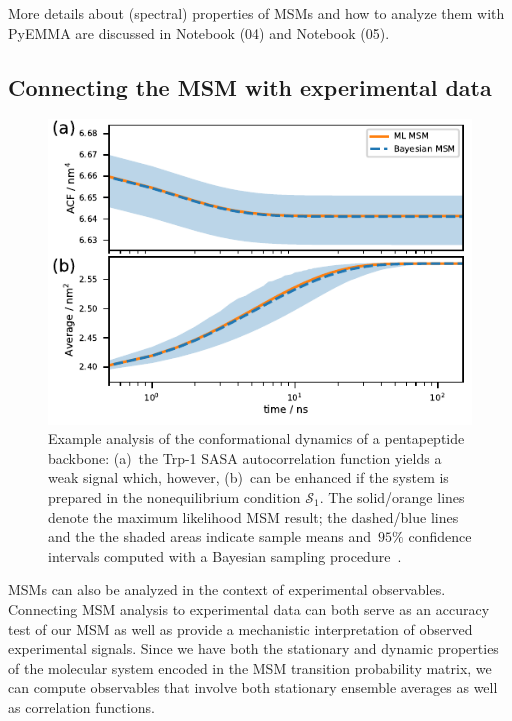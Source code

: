\documentclass[9pt,tutorial]{livecoms}
\begin{document}
More details about (spectral) properties of MSMs and how to analyze them with PyEMMA are discussed in Notebook (04) and Notebook (05).

\subsection{Connecting the MSM with experimental data}

\begin{figure}
\includegraphics{figure_7}
\caption{Example analysis of the conformational dynamics of a pentapeptide backbone:
(a)~the Trp-1 SASA autocorrelation function yields a weak signal which, however,
(b)~can be enhanced if the system is prepared in the nonequilibrium condition $\mathcal{S}_1$.
The solid/orange lines denote the maximum likelihood MSM result;
the dashed/blue lines and the the shaded areas indicate sample means and~$95\%$ confidence intervals computed with a Bayesian sampling procedure~\cite{ben-rev-msm}.}
\label{fig:msm-exp-obs}
\end{figure}

MSMs can also be analyzed in the context of experimental observables.
Connecting MSM analysis to experimental data can both serve as an accuracy test of our MSM as well as provide a mechanistic interpretation of observed experimental signals.
Since we have both the stationary and dynamic properties of the molecular system encoded in the MSM transition probability matrix,
we can compute observables that involve both stationary ensemble averages as well as correlation functions.
\end{document}
